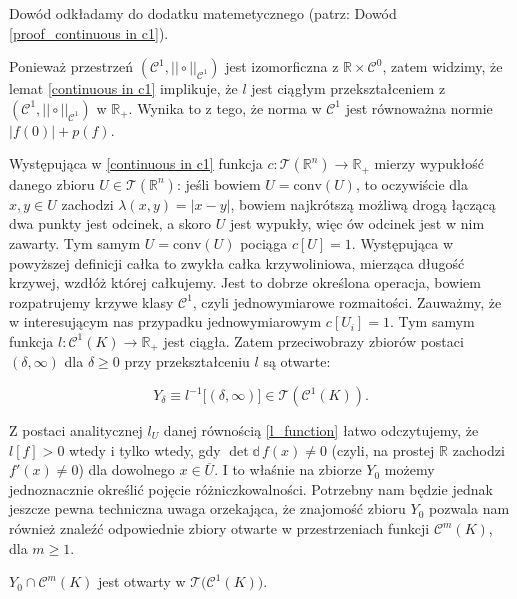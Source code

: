 Dowód odkładamy do dodatku matemetycznego (patrz: Dowód \ref{proof_continuous in c1}). 

Ponieważ przestrzeń $ (\mathcal{C}^{1}, || \circ||_{\mathcal{C}^1}) $ jest izomorficzna z $ \mathbb{R} \times \mathcal{C}^{0} $, zatem widzimy, że lemat \ref{continuous in c1} implikuje, że $ l $ jest ciągłym przekształceniem z $  (\mathcal{C}^{1}, || \circ||_{\mathcal{C}^1})  $ w $ \mathbb{R}_{+} $. Wynika to z tego, że norma w $\mathcal{C}^{1}$ jest równoważna normie $|f(0)|+p(f)$. 
 

Występująca w \ref{continuous in c1} funkcja $ c: \mathcal{T}(\mathbb{R}^n) \rightarrow \mathbb{R}_{+}$ mierzy wypukłość danego zbioru $ U \in \mathcal{T}(\mathbb{R}^n)$: jeśli bowiem $ U = \mathrm{conv}(U) $, to oczywiście dla $ x,y \in U $ zachodzi $  \lambda(x,y) = |x-y| $, bowiem najkrótszą możliwą drogą łączącą dwa punkty jest odcinek, a skoro $ U $ jest wypukły, więc ów odcinek jest w nim zawarty. Tym samym $ U = \mathrm{conv}(U) $ pociąga $ c[U] = 1 $. Występująca w powyższej definicji całka to zwykła całka krzywoliniowa, mierząca długość krzywej, wzdłóż której całkujemy. Jest to dobrze określona operacja, bowiem rozpatrujemy krzywe klasy $ \mathcal{C}^{1} $, czyli jednowymiarowe rozmaitości. Zauważmy, że w interesującym nas przypadku jednowymiarowym $c[U_i] =1$. Tym samym funkcja $l: \mathcal{C}^{1}(K) \rightarrow \mathbb{R}_{+}$ jest ciągła. Zatem przeciwobrazy zbiorów postaci $(\delta, \infty)$ dla $\delta \geq 0$ przy przekształceniu $l$ są otwarte:

\begin{equation*}
	Y_{\delta} \equiv l^{-1}\Big[ (\delta, \infty)\Big] \in \mathcal{T}(\mathcal{C}^{1}(K)).
\end{equation*} 

 

 
Z postaci analitycznej  $ l_U $ danej równością \ref{l_function} łatwo odczytujemy, że $ l[f] > 0 $ wtedy i tylko wtedy, gdy $ \det \mathbb{d}\,f(x) \not = 0 $ (czyli, na prostej $\mathbb{R}$ zachodzi $f'(x) \not = 0$) dla dowolnego $ x \in \overline{U} $. I to właśnie na zbiorze $ Y_{0} $ możemy jednoznacznie określić pojęcie różniczkowalności. Potrzebny nam będzie jednak jeszcze pewna techniczna uwaga orzekająca, że znajomość zbioru $Y_0$ pozwala nam również znaleźć odpowiednie zbiory otwarte w przestrzeniach funkcji $\mathcal{C}^{m}(K)$, dla $m \geq 1$. 

\begin{lemat}\label{openess_of_Y_0}
$Y_0\cap \mathcal{C}^{m}(K)$ jest otwarty w $\mathcal{T}\Big( \mathcal{C}^{1}(K)\Big)$.
\end{lemat}

